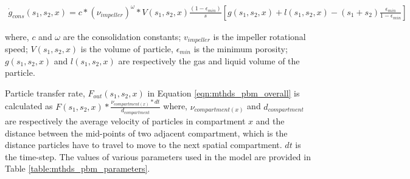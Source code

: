 \documentclass[preprint,11pt,authoryear]{elsarticle}
\begin{document}
	      \begin{align}
	      \dot{g}_{cons}(s_1,s_2,x)=c*(\nu_{impeller})^{\omega}*V(s_1,s_2,x)\frac{(1-\epsilon_{min})}{s} [g(s_1,s_2,x)+l(s_1,s_2,x) -(s_1+s_2)\frac{\epsilon_{min}}{1-\epsilon_{min}}]
	      \end{align}          
	    
	    \par where, $c$ and $\omega$ are the consolidation constants; $v_{impeller}$ is the impeller rotational speed; $V(s_1,s_2,x)$ is the volume of particle, $\epsilon_{min}$ is the minimum porosity; $g(s_1,s_2,x)$ and $l(s_1,s_2,x)$ are respectively the gas and liquid volume of the particle.
	  
	    \par Particle transfer rate, $F_{out}(s_1,s_2,x)$ in Equation \ref{eqn:mthds_pbm_overall} is calculated as $F(s_1,s_2,x)*\frac{\nu_{compartment(x)}*dt}{d_{compartment}}$ where, $\nu_{compartment(x)}$ and $d_{compartment}$ are respectively the average velocity of particles in compartment $x$ and the distance between the mid-points of two adjacent compartment, which is the distance particles have to travel to move to the next spatial compartment. $dt$ is the time-step.
	The values of various parameters used in the model are provided in Table \ref{table:mthds_pbm_parameters}.
	
\end{document}
